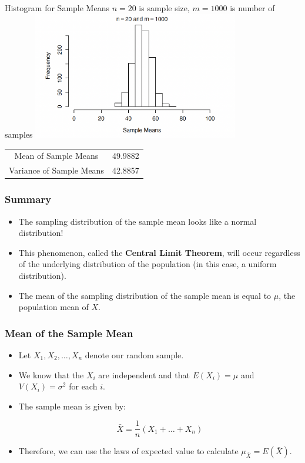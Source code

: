 \documentclass[12pt]{beamer}
\begin{document}
\begin{frame}{Histogram for Sample Means}
	$n=20$ is sample size, $m=1000$ is number of samples
	\centering
	\includegraphics[width=9cm]{histo5.png}
	\begin{tabular}{cc}
		\toprule
		Mean of Sample Means& 49.9882\\
		Variance of Sample Means&42.8857\\
		\bottomrule
	\end{tabular}
\end{frame}
\begin{frame}
	\frametitle{Summary}
	\begin{itemize}[label={\color{blue}$\blacktriangleright$}]
		\item The sampling distribution of the sample mean looks like a normal distribution!
		\item This phenomenon, called the {\bf Central Limit Theorem}, will occur regardless of the underlying distribution of the population (in this case, a uniform distribution).
		\item The mean of the sampling distribution of the sample mean is equal to $\mu$, the population mean of $X$.
	\end{itemize}
	
\end{frame}
\begin{frame}
	\frametitle{Mean of the Sample Mean}
	
	\begin{itemize}[label={\color{blue}$\blacktriangleright$}]
		\item Let $X_1, X_2, \ldots, X_n$ denote our random sample.
		
		\item We know that the $X_i$ are independent and that 
		$E(X_i) = \mu$ and $V(X_i) = \sigma^2$ for each $i$.
		
		\item The sample mean is given by:
		
		\[ \bar{X} = \frac{1}{n}(X_1 + \ldots + X_n) \]
		
		\item Therefore, we can use the laws of expected value to calculate $\mu_{\bar{X}} = E(\bar{X})$.
	\end{itemize}
	
\end{frame}
\end{document}
